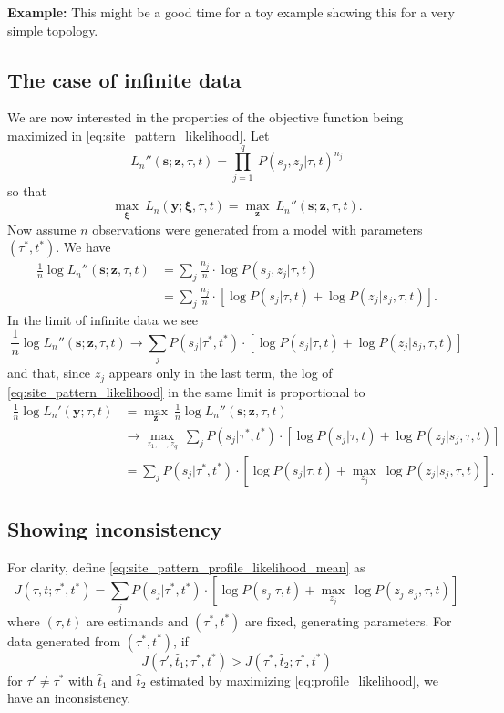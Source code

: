 \documentclass[a4paper]{article}
\begin{document}
\textbf{Example:} This might be a good time for a toy example showing this for a very simple topology.

\subsection{The case of infinite data}

We are now interested in the properties of the objective function being maximized in \eqref{eq:site_pattern_likelihood}.
Let
$$
L_n''(\mathbf{s};\mathbf{z},\tau,t) = \prod_{j=1}^q \ P(s_j, z_j | \tau, t)^{n_j}
$$
so that
$$
\max_{\boldsymbol\xi} \ L_n(\mathbf{y};\boldsymbol\xi, \tau, t) = \max_{\mathbf{z}} \ L_n''(\mathbf{s};\mathbf{z},\tau,t).
$$
Now assume $n$ observations were generated from a model with parameters $(\tau^*, t^*)$.
We have
\begin{align}
\frac{1}{n} \log L_n''(\mathbf{s};\mathbf{z},\tau,t) &= \sum_{j} \frac{n_j}{n}\cdot \log P(s_j, z_j | \tau, t) \\
  &= \sum_{j} \frac{n_j}{n}\cdot [\log P(s_j | \tau, t) + \log P(z_j | s_j, \tau, t)].
\end{align}
In the limit of infinite data we see
$$
\frac{1}{n} \log L_n''(\mathbf{s};\mathbf{z},\tau,t) \rightarrow \sum_{j} P(s_j | \tau^*, t^*) \cdot [\log P(s_j | \tau, t) + \log P(z_j | s_j, \tau, t)]
$$
and that, since $z_j$ appears only in the last term, the log of \eqref{eq:site_pattern_likelihood} in the same limit is proportional to
\begin{align}
\frac{1}{n} \log L_n'(\mathbf{y};\tau, t) &= \max_{\mathbf{z}} \ \frac{1}{n} \log L_n''(\mathbf{s};\mathbf{z},\tau,t) \\
    &\rightarrow \max_{z_1, \ldots, z_q} \ \sum_{j} P(s_j | \tau^*, t^*) \cdot [\log P(s_j | \tau, t) + \log P(z_j | s_j, \tau, t)] \\
    &= \sum_{j} P(s_j | \tau^*, t^*) \cdot [\log P(s_j | \tau, t) + \max_{z_j} \ \log P(z_j | s_j, \tau, t)]. \label{eq:site_pattern_profile_likelihood_mean}
\end{align}

\subsection{Showing inconsistency}

For clarity, define \eqref{eq:site_pattern_profile_likelihood_mean} as
$$
J(\tau, t; \tau^*, t^*) = \sum_{j} P(s_j | \tau^*, t^*) \cdot [\log P(s_j | \tau, t) + \max_{z_j} \ \log P(z_j | s_j, \tau, t)]
$$
where $(\tau, t)$ are estimands and $(\tau^*, t^*)$ are fixed, generating parameters.
For data generated from $(\tau^*, t^*)$, if
\begin{equation}
\label{eq:inconsistency_inequality}
J(\tau', \hat{t}_1; \tau^*, t^*) > J(\tau^*, \hat{t}_2; \tau^*, t^*)
\end{equation}
for $\tau'\neq\tau^*$ with $\hat{t}_1$ and $\hat{t}_2$ estimated by maximizing \eqref{eq:profile_likelihood}, we have an inconsistency.
\end{document}
